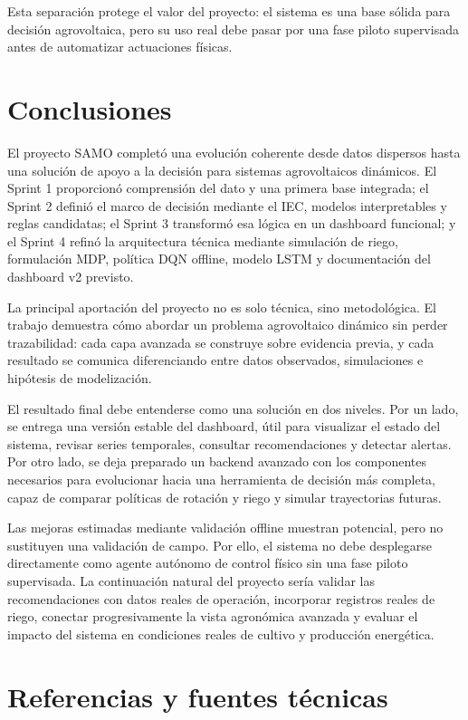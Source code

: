 ﻿\documentclass[11pt,a4paper]{article}
\begin{document}
Esta separación protege el valor del proyecto: el sistema es una base sólida para decisión agrovoltaica, pero su uso real debe pasar por una fase piloto supervisada antes de automatizar actuaciones físicas.
\newpage

\section{Conclusiones}

El proyecto SAMO completó una evolución coherente desde datos dispersos hasta una solución de apoyo a la decisión para sistemas agrovoltaicos dinámicos. El Sprint 1 proporcionó comprensión del dato y una primera base integrada; el Sprint 2 definió el marco de decisión mediante el IEC, modelos interpretables y reglas candidatas; el Sprint 3 transformó esa lógica en un dashboard funcional; y el Sprint 4 refinó la arquitectura técnica mediante simulación de riego, formulación MDP, política DQN offline, modelo LSTM y documentación del dashboard v2 previsto.

La principal aportación del proyecto no es solo técnica, sino metodológica. El trabajo demuestra cómo abordar un problema agrovoltaico dinámico sin perder trazabilidad: cada capa avanzada se construye sobre evidencia previa, y cada resultado se comunica diferenciando entre datos observados, simulaciones e hipótesis de modelización.

El resultado final debe entenderse como una solución en dos niveles. Por un lado, se entrega una versión estable del dashboard, útil para visualizar el estado del sistema, revisar series temporales, consultar recomendaciones y detectar alertas. Por otro lado, se deja preparado un backend avanzado con los componentes necesarios para evolucionar hacia una herramienta de decisión más completa, capaz de comparar políticas de rotación y riego y simular trayectorias futuras.

Las mejoras estimadas mediante validación offline muestran potencial, pero no sustituyen una validación de campo. Por ello, el sistema no debe desplegarse directamente como agente autónomo de control físico sin una fase piloto supervisada. La continuación natural del proyecto sería validar las recomendaciones con datos reales de operación, incorporar registros reales de riego, conectar progresivamente la vista agronómica avanzada y evaluar el impacto del sistema en condiciones reales de cultivo y producción energética.
\newpage

\section{Referencias y fuentes técnicas}
\end{document}
